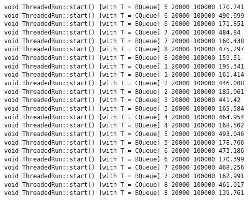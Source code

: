 \begin{verbatim}
void ThreadedRun::start() [with T = BQueue] 5 20000 100000 170.741
void ThreadedRun::start() [with T = CQueue] 6 20000 100000 490.699
void ThreadedRun::start() [with T = BQueue] 6 20000 100000 171.851
void ThreadedRun::start() [with T = CQueue] 7 20000 100000 484.84
void ThreadedRun::start() [with T = BQueue] 7 20000 100000 160.438
void ThreadedRun::start() [with T = CQueue] 8 20000 100000 475.297
void ThreadedRun::start() [with T = BQueue] 8 20000 100000 159.51
void ThreadedRun::start() [with T = CQueue] 1 20000 100000 195.341
void ThreadedRun::start() [with T = BQueue] 1 20000 100000 161.414
void ThreadedRun::start() [with T = CQueue] 2 20000 100000 446.008
void ThreadedRun::start() [with T = BQueue] 2 20000 100000 185.061
void ThreadedRun::start() [with T = CQueue] 3 20000 100000 441.42
void ThreadedRun::start() [with T = BQueue] 3 20000 100000 165.584
void ThreadedRun::start() [with T = CQueue] 4 20000 100000 464.954
void ThreadedRun::start() [with T = BQueue] 4 20000 100000 168.502
void ThreadedRun::start() [with T = CQueue] 5 20000 100000 493.046
void ThreadedRun::start() [with T = BQueue] 5 20000 100000 178.766
void ThreadedRun::start() [with T = CQueue] 6 20000 100000 473.186
void ThreadedRun::start() [with T = BQueue] 6 20000 100000 170.399
void ThreadedRun::start() [with T = CQueue] 7 20000 100000 468.256
void ThreadedRun::start() [with T = BQueue] 7 20000 100000 162.991
void ThreadedRun::start() [with T = CQueue] 8 20000 100000 461.017
void ThreadedRun::start() [with T = BQueue] 8 20000 100000 139.761
\end{verbatim}

